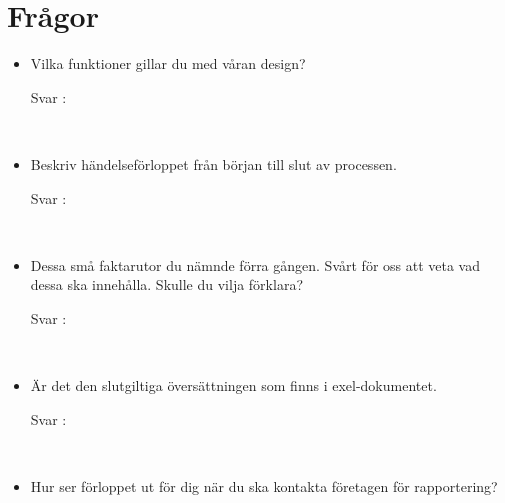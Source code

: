 \documentclass{article}
\date {#1}
\title {
    \documentTitle {Helsingborg Event and Convention Bureau}
    
    \documentDate {}
}
\begin{document}
\maketitle
\thispagestyle{empty}

\newpage




\newpage

\section{Frågor}

 
\begin{itemize}
 \item Vilka funktioner gillar du med våran design?
        \begin{description}
            \item[Svar :]
        \end{description}
    \\
    \item Beskriv händelseförloppet från början till slut av processen.
        \begin{description}
            \item[Svar :]
        \end{description}
    \\
    \item Dessa små faktarutor du nämnde förra gången. Svårt för oss att veta vad dessa ska innehålla. Skulle du vilja förklara?
        \begin{description}
            \item[Svar :]
        \end{description}  
    \\
     \item Är det den slutgiltiga översättningen som finns i exel-dokumentet.
        \begin{description}
            \item[Svar :]
        \end{description}
    \\
    \item Hur ser förloppet ut för dig när du ska kontakta företagen för rapportering? 
    

\end{itemize}
\end{document}
